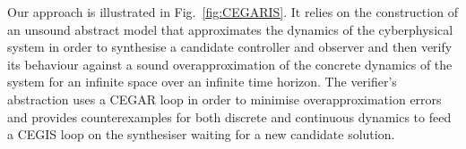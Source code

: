 \documentclass[sigconf]{llncs}
\begin{document}



Our approach is illustrated in Fig.~\ref{fig:CEGARIS}. It relies on the
construction of an unsound abstract model that approximates the dynamics
of the cyberphysical system in order to synthesise a candidate controller
and observer and then verify its behaviour against a sound overapproximation
of the concrete dynamics of the system for an infinite space over an infinite
time horizon.
The verifier's abstraction uses a CEGAR loop in order to minimise 
overapproximation errors and provides counterexamples for both
discrete and continuous dynamics to feed a CEGIS loop on the synthesiser
waiting for a new candidate solution. 
\end{document}
